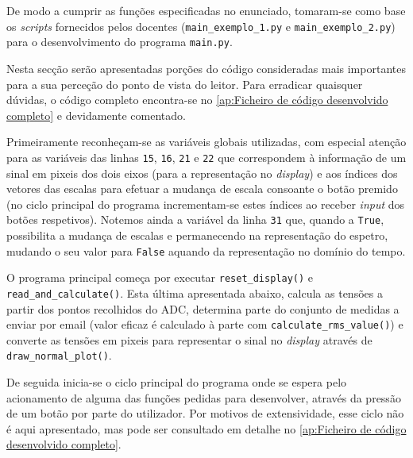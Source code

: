 De modo a cumprir as funções especificadas no enunciado, tomaram-se como base os \textit{scripts} fornecidos pelos docentes (\texttt{main\_exemplo\_1.py} e \texttt{main\_exemplo\_2.py}) para o desenvolvimento do programa \texttt{main.py}.

Nesta secção serão apresentadas porções do código consideradas mais importantes para a sua perceção do ponto de vista do leitor. Para erradicar quaisquer dúvidas, o código completo encontra-se no \autoref{ap:Ficheiro de código desenvolvido completo} e devidamente comentado. \newline

Primeiramente reconheçam-se as variáveis globais utilizadas, com especial atenção para as variáveis das linhas \texttt{15}, \texttt{16}, \texttt{21} e \texttt{22} que correspondem à informação de um sinal em pixeis dos dois eixos (para a representação no \textit{display}) e aos índices dos vetores das escalas para efetuar a mudança de escala consoante o botão premido (no ciclo principal do programa incrementam-se estes índices ao receber \textit{input} dos botões respetivos). Notemos ainda a variável da linha \texttt{31} que, quando a \texttt{True}, possibilita a mudança de escalas e permanecendo na representação do espetro, mudando o seu valor para \texttt{False} aquando da representação no domínio do tempo.



O programa principal começa por executar \texttt{reset\_display()} e \texttt{read\_and\_calculate()}. Esta última apresentada abaixo, calcula as tensões a partir dos pontos recolhidos do ADC, determina parte do conjunto de medidas a enviar por email (valor eficaz é calculado à parte com \texttt{calculate\_rms\_value()}) e converte as tensões em pixeis para representar o sinal no \textit{display} através de \texttt{draw\_normal\_plot()}.



De seguida inicia-se o ciclo principal do programa onde se espera pelo acionamento de alguma das funções pedidas para desenvolver, através da pressão de um botão por parte do utilizador. Por motivos de extensividade, esse ciclo não é aqui apresentado, mas pode ser consultado em detalhe no \autoref{ap:Ficheiro de código desenvolvido completo}. \newline

